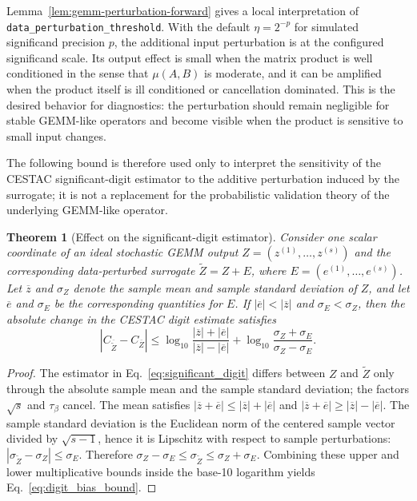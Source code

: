 \documentclass[manuscript, screen]{acmart}
\newtheorem{theorem}{Theorem}
\begin{document}
Lemma~\ref{lem:gemm-perturbation-forward} gives a local interpretation of
\texttt{data\_perturbation\_threshold}. With the default
$\eta=2^{-p}$ for simulated significand precision $p$, the additional
input perturbation is at the configured significand scale. Its output effect is small
when the matrix product is well conditioned in the sense that
$\mu(A,B)$ is moderate, and it can be amplified when the product itself is
ill conditioned or cancellation dominated. This is the desired behavior
for diagnostics: the perturbation should remain negligible for stable
GEMM-like operators and become visible when the product is sensitive to
small input changes.


The following bound is therefore used only to interpret the sensitivity of the
CESTAC significant-digit estimator to the additive perturbation induced by the
surrogate; it is not a replacement for the probabilistic validation theory of
the underlying GEMM-like operator.

\begin{theorem}[Effect on the significant-digit estimator]
\label{thm:gemm_digit_bias}
Consider one scalar coordinate of an ideal stochastic GEMM output
$Z=(z^{(1)},\ldots,z^{(s)})$ and the corresponding data-perturbed
surrogate $\widetilde{Z}=Z+E$, where
$E=(e^{(1)},\ldots,e^{(s)})$. Let $\overline{z}$ and $\sigma_Z$ denote
the sample mean and sample standard deviation of $Z$, and let
$\overline{e}$ and $\sigma_E$ be the corresponding quantities for $E$.
If $|\overline{e}|<|\overline{z}|$ and $\sigma_E<\sigma_Z$, then the
absolute change in the CESTAC digit estimate satisfies
\begin{equation}
\left|
C_{\overline{\widetilde{Z}}}
-
C_{\overline{Z}}
\right|
\le
\log_{10}
\frac{|\overline{z}|+|\overline{e}|}
     {|\overline{z}|-|\overline{e}|}
+
\log_{10}
\frac{\sigma_Z+\sigma_E}
     {\sigma_Z-\sigma_E}.
\label{eq:digit_bias_bound}
\end{equation}
\end{theorem}

\begin{proof}
The estimator in Eq.~\eqref{eq:significant_digit} differs between
$Z$ and $\widetilde{Z}$ only through the absolute sample mean and the
sample standard deviation; the factors $\sqrt{s}$ and $\tau_\beta$
cancel. The mean satisfies
$|\overline{z}+\overline{e}|\le|\overline{z}|+|\overline{e}|$ and
$|\overline{z}+\overline{e}|\ge|\overline{z}|-|\overline{e}|$. The
sample standard deviation is the Euclidean norm of the centered sample
vector divided by $\sqrt{s-1}$, hence it is Lipschitz with respect to
sample perturbations:
$|\sigma_{\widetilde{Z}}-\sigma_Z|\le\sigma_E$. Therefore
$\sigma_Z-\sigma_E\le\sigma_{\widetilde{Z}}\le\sigma_Z+\sigma_E$.
Combining these upper and lower multiplicative bounds inside the
base-10 logarithm yields Eq.~\eqref{eq:digit_bias_bound}.
\end{proof}
\end{document}

